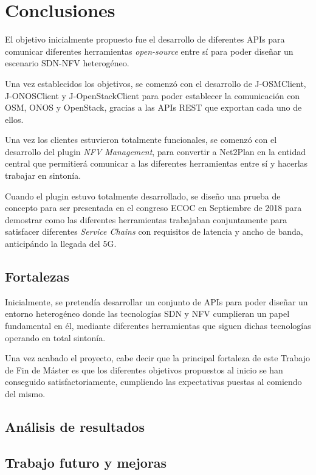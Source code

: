 \chapter{Conclusiones}
\label{conclusiones}

El objetivo inicialmente propuesto fue el desarrollo de diferentes \acp{API} para comunicar diferentes herramientas \textit{open-source} entre sí para poder diseñar un escenario \ac{SDN}-\ac{NFV} heterogéneo.

Una vez establecidos los objetivos, se comenzó con el desarrollo de J-OSMClient, J-ONOSClient y J-OpenStackClient para poder establecer la comunicación con \ac{OSM}, \ac{ONOS} y OpenStack, gracias a las \acp{API} \ac{REST} que exportan cada uno de ellos.

Una vez los clientes estuvieron totalmente funcionales, se comenzó con el desarrollo del plugin \textit{NFV Management}, para convertir a Net2Plan en la entidad central que permitierá comunicar a las diferentes herramientas entre sí y hacerlas trabajar en sintonía.

Cuando el plugin estuvo totalmente desarrollado, se diseño una prueba de concepto para ser presentada en el congreso \ac{ECOC} en Septiembre de 2018 para demostrar como las diferentes herramientas trabajaban conjuntamente para satisfacer diferentes \textit{Service Chains} con requisitos de latencia y ancho de banda, anticipándo la llegada del 5G.


\section{Fortalezas}

Inicialmente, se pretendía desarrollar un conjunto de \acp{API} para poder diseñar un entorno heterogéneo donde las tecnologías \ac{SDN} y \ac{NFV} cumplieran un papel fundamental en él, mediante diferentes herramientas que siguen dichas tecnologías operando en total sintonía.

Una vez acabado el proyecto, cabe decir que la principal fortaleza de este Trabajo de Fin de Máster es que los diferentes objetivos propuestos al inicio se han conseguido satisfactoriamente, cumpliendo las expectativas puestas al comiendo del mismo.

\section{Análisis de resultados}

\section{Trabajo futuro y mejoras}

